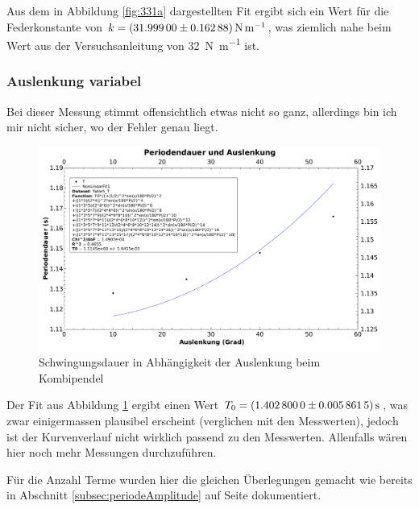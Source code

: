 Aus dem  in Abbildung  \ref{fig:331a} dargestellten Fit  ergibt sich  ein Wert
f\"ur die  Federkonstante von  $k = \SI[separate-uncertainty  = true]{31.999
\pm  0.16288}{\newton\per\meter}$,  was  ziemlich   nahe  beim  Wert  aus  der
Versuchsanleitung von \SI{32}{\newton\per\meter} ist.


\clearpage
\subsubsection{Auslenkung variabel}
\label{subsubsec:kombiP:auslvar}

Bei dieser Messung stimmt offensichtlich etwas nicht so ganz, allerdings bin ich
mir nicht sicher, wo der Fehler genau liegt.


\begin{figure}[h!]
    \centering
    \includegraphics[width=\textwidth]{images/331b.pdf}
    \caption{%
        Schwingungsdauer in Abh\"angigkeit der Auslenkung beim Kombipendel
    }
    \label{fig:331b}
\end{figure}

Der   Fit   aus   Abbildung   \ref{fig:331b}  ergibt   einen   Wert   $T_0   =
\SI[separate-uncertainty  = true]{1.4028  \pm  0.0058615}{\second}$, was  zwar
einigermassen plausibel erscheint (verglichen  mit den Messwerten), jedoch ist
der Kurvenverlauf nicht wirklich passend zu den Messwerten. Allenfalls w\"aren
hier noch mehr Messungen durchzuf\"uhren.

F\"ur   die   Anzahl   Terme   wurden   hier   die   gleichen   \"Uberlegungen
gemacht  wie  bereits  in Abschnitt  \ref{subsec:periodeAmplitude}  auf  Seite
\pageref{subsec:periodeAmplitude} dokumentiert.




